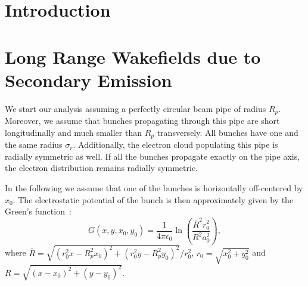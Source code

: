 \documentclass[1p]{elsarticle}%
\begin{document}
\section{Introduction}

\section{Long Range Wakefields due to Secondary Emission}
	
	We start our analysis assuming a perfectly circular beam pipe of radius $R_{p}$.
	Moreover, we assume that bunches propagating through this pipe are short longitudinally and much smaller than $R_{p}$ transversely.
	All bunches have one and the same radius $\sigma_{r}$.
	Additionally, the electron cloud populating this pipe is radially symmetric as well.
	If all the bunches propagate exactly on the pipe axis, the electron distribution remains radially symmetric.

	In the following we assume that one of the bunches is horizontally off-centered by $x_{0}$.
	The electrostatic potential of the bunch is then approximately given by the Green's function~\cite{kapin}:
\begin{equation}\label{green_function}
G(x,y,x_{0},y_{0})=\frac{1}{4 \pi \epsilon_{0}} \ln \left ( \frac{\bar{R}^{2} r_{0}^{2}}{R^{2} a_{0}^{2}} \right ),
\end{equation}
where $\bar{R}=\sqrt{(r_{0}^{2}x-R_{p}^{2}x_{0})^{2}+(r_{0}^{2}y-R_{p}^{2}y_{0})^{2}}/r_{0}^{2}$, $r_{0}=\sqrt{x_{0}^{2}+y_{0}^{2}}$ and $R=\sqrt{(x-x_{0})^{2}+(y-y_{0})^{2}}$.
\end{document}
